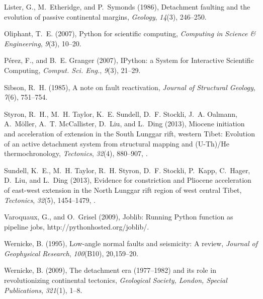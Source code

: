 \documentclass[twocolumn,grl]{AGUTeX}
\begin{document}
\begin{article}
\begin{thebibliography}{30}
Lister, G., M.~Etheridge, and P.~Symonds (1986), Detachment faulting and the
  evolution of passive continental margins, \textit{Geology}, \textit{14}(3),
  246--250.

Oliphant, T.~E. (2007), Python for scientific computing, \textit{Computing in
  Science \& Engineering}, \textit{9}(3), 10--20.

P\'erez, F., and B.~E. Granger (2007), {IP}ython: a {S}ystem for {I}nteractive
  {S}cientific {C}omputing, \textit{{C}omput. {S}ci. {E}ng.}, \textit{9}(3),
  21--29.

Sibson, R.~H. (1985), A note on fault reactivation, \textit{Journal of
  Structural Geology}, \textit{7}(6), 751--754.

Styron, R.~H., M.~H. Taylor, K.~E. Sundell, D.~F. Stockli, J.~A. Oalmann,
  A.~M{\"o}ller, A.~T. McCallister, D.~Liu, and L.~Ding (2013), Miocene
  initiation and acceleration of extension in the {S}outh {L}unggar rift,
  western {T}ibet: Evolution of an active detachment system from structural
  mapping and ({U}-{T}h)/{H}e thermochronology, \textit{Tectonics},
  \textit{32}(4), 880--907, .

Sundell, K.~E., M.~H. Taylor, R.~H. Styron, D.~F. Stockli, P.~Kapp, C.~Hager,
D.~Liu, and L.~Ding (2013), Evidence for constriction and {P}liocene
acceleration of east-west extension in the {N}orth {L}unggar rift region of west
central {T}ibet, \textit{Tectonics}, \textit{32}(5), 1454--1479,
  .

Varoquaux, G., and O.~Grisel (2009), {J}oblib: {R}unning {P}ython function as
pipeline jobs, http://pythonhosted.org/joblib/.

Wernicke, B. (1995), Low-angle normal faults and seismicity: A review,
  \textit{Journal of Geophysical Research}, \textit{100}(B10), 20,159--20.

Wernicke, B. (2009), The detachment era (1977--1982) and its role in
  revolutionizing continental tectonics, \textit{Geological Society, London,
  Special Publications}, \textit{321}(1), 1--8.


\end{thebibliography}
\end{article}
\end{document}
